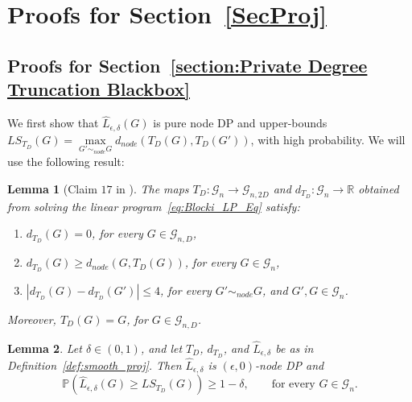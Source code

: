 \documentclass{article}
\newtheorem{lemma}{Lemma}
\begin{document}

\section{Proofs for Section~\ref{SecProj}}
\label{AppProj}

\subsection{Proofs for Section~\ref{section:Private Degree Truncation Blackbox}}
\label{AppTrunc}

We first show that $\hat{L}_{\epsilon, \delta}(G)$ is pure node DP and upper-bounds $LS_{T_D}(G) = \mathop{\max}\limits_{G' \sim_{node} G}d_{node}(T_D(G), T_D(G'))$, with high probability. We will use the following result:

\begin{lemma}[Claim $17$ in \cite{blocki2013differentially}]
\label{lemma:Efficient_T}
The maps $T_D : \mathcal{G}_n \rightarrow \mathcal{G}_{n, 2D}$ and $d_{T_D} : \mathcal{G}_n \rightarrow \mathbb{R}$ obtained from solving the linear program~\eqref{eq:Blocki_LP_Eq} satisfy:
\begin{enumerate}
    \item $d_{T_D}(G) = 0$, for every $G \in \mathcal{G}_{n, D}$,
    \item $d_{T_D}(G) \geq d_{node}(G, T_D(G))$, for every $G \in \mathcal{G}_n$,
    \item $|d_{T_D}(G) - d_{T_D}(G')| \leq 4$, for every $G' \sim_{node} G$, and $G', G \in \mathcal{G}_{n}$.
\end{enumerate}
Moreover, $T_D(G) = G$, for $G \in \mathcal{G}_{n, D}$.
\end{lemma}

\begin{lemma}
\label{lemma:Lhat}
Let $\delta \in (0, 1)$, and let $T_D$, $d_{T_D}$, and $\hat{L}_{\epsilon, \delta}$ be as in Definition~\ref{def:smooth_proj}. Then $\hat{L}_{\epsilon, \delta}$ is $(\epsilon, 0)$-node DP and
\begin{equation*}
\mathbb{P}(\hat{L}_{\epsilon, \delta}(G) \geq LS_{T_D}(G)) \geq 1 - \delta, \qquad \text{for every } G \in \mathcal{G}_n.
\end{equation*}
\end{lemma}
\end{document}
